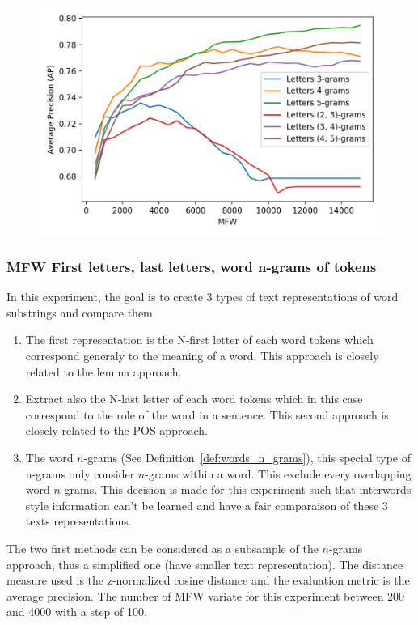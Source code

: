 \begin{figure}
  \label{fig:letter_ngrams_st_jean}
  \includegraphics[width=\linewidth]{img/letter_ngrams_st_jean.png}
\end{figure}

\subsubsection{MFW First letters, last letters, word n-grams of tokens}

In this experiment, the goal is to create 3 types of text representations of word substrings and compare them.

\begin{enumerate}
  \item
  The first representation is the N-first letter of each word tokens which correspond generaly to the meaning of a word.
  This approach is closely related to the lemma approach.
  \item
  Extract also the N-last letter of each word tokens which in this case correspond to the role of the word in a sentence.
  This second approach is closely related to the POS approach.
  \item
  The word $n$-grams (See Definition~\ref{def:words_n_grams}), this special type of n-grams only consider $n$-grams within a word.
  This exclude every overlapping word $n$-grams.
  This decision is made for this experiment such that interwords style information can't be learned and have a fair comparaison of these 3 texts representations.
\end{enumerate}
The two first methods can be considered as a subsample of the $n$-grams approach, thus a simplified one (have smaller text representation).
The distance measure used is the z-normalized cosine distance and the evaluation metric is the average precision.
The number of MFW variate for this experiment between 200 and 4000 with a step of 100.

